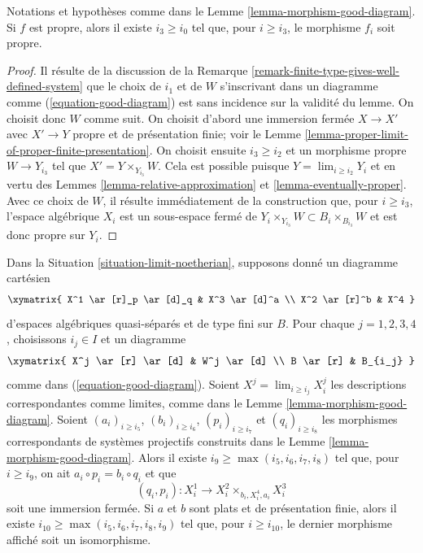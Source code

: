 \begin{lemma}
\label{lemma-morphism-good-diagram-proper}
Notations et hypoth\`eses comme dans le Lemme \ref{lemma-morphism-good-diagram}.
Si $f$ est propre, alors il existe $i_3 \geq i_0$ tel que, pour
$i \geq i_3$, le morphisme $f_i$ soit propre.
\end{lemma}

\begin{proof}
Il r\'esulte de la discussion de la 
Remarque \ref{remark-finite-type-gives-well-defined-system}
que le choix de $i_1$ et de $W$ s'inscrivant dans un diagramme comme
(\ref{equation-good-diagram}) est sans incidence sur la validit\'e du
lemme. On choisit donc $W$ comme suit.
On choisit d'abord une immersion ferm\'ee $X \to X'$
avec $X' \to Y$ propre et de pr\'esentation finie; voir le
Lemme \ref{lemma-proper-limit-of-proper-finite-presentation}.
On choisit ensuite $i_3 \geq i_2$ et un morphisme propre $W \to Y_{i_3}$
tel que $X' = Y \times_{Y_{i_3}} W$. Cela est possible puisque
$Y = \lim_{i \geq i_2} Y_i$ et en vertu des
Lemmes \ref{lemma-relative-approximation} et \ref{lemma-eventually-proper}.
Avec ce choix de $W$, il r\'esulte imm\'ediatement de la construction que,
pour $i \geq i_3$, l'espace alg\'ebrique $X_i$ est un sous-espace ferm\'e de
$Y_i \times_{Y_{i_3}} W \subset B_i \times_{B_{i_3}} W$
et est donc propre sur $Y_i$.
\end{proof}

\begin{lemma}
\label{lemma-good-diagram-fibre-product}
Dans la Situation \ref{situation-limit-noetherian}, supposons donn\'e un
diagramme cart\'esien
$$
\xymatrix{
X^1 \ar[r]_p \ar[d]_q & X^3 \ar[d]^a \\
X^2 \ar[r]^b & X^4
}
$$
d'espaces alg\'ebriques quasi-s\'epar\'es et de type fini sur $B$.
Pour chaque $j = 1, 2, 3, 4$, choisissons $i_j \in I$ et un diagramme
$$
\xymatrix{
X^j \ar[r] \ar[d] & W^j \ar[d] \\
B \ar[r] & B_{i_j}
}
$$
comme dans (\ref{equation-good-diagram}). Soient
$X^j = \lim_{i \geq i_j} X^j_i$ les descriptions correspondantes comme limites,
comme dans le Lemme \ref{lemma-morphism-good-diagram}.
Soient $(a_i)_{i \geq i_5}$, $(b_i)_{i \geq i_6}$, $(p_i)_{i \geq i_7}$ et
$(q_i)_{i \geq i_8}$ les morphismes correspondants de syst\`emes projectifs
construits dans le Lemme \ref{lemma-morphism-good-diagram}. Alors il existe
$i_9 \geq \max(i_5, i_6, i_7, i_8)$ tel que, pour $i \geq i_9$, on ait
$a_i \circ p_i = b_i \circ q_i$ et que
$$
(q_i, p_i) : X^1_i \longrightarrow X^2_i \times_{b_i, X^4_i, a_i} X^3_i
$$
soit une immersion ferm\'ee.
Si $a$ et $b$ sont plats et de pr\'esentation finie, alors il existe
$i_{10} \geq \max(i_5, i_6, i_7, i_8, i_9)$ tel que, pour $i \geq i_{10}$,
le dernier morphisme affich\'e soit un isomorphisme.
\end{lemma}

